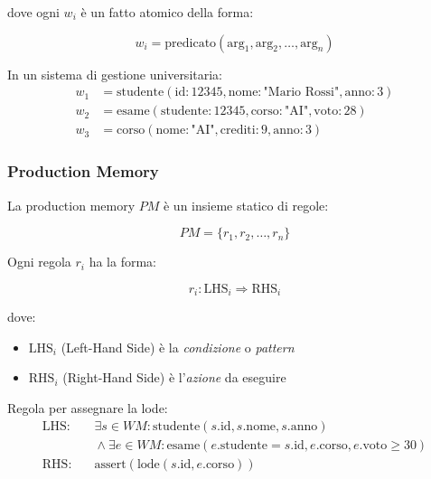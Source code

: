 dove ogni $w_i$ è un fatto atomico della forma:

\begin{equation}
w_i = \text{predicato}(\text{arg}_1, \text{arg}_2, \ldots, \text{arg}_n)
\end{equation}

\begin{esempio}
In un sistema di gestione universitaria:
\begin{align*}
w_1 &= \text{studente}(\text{id}: 12345, \text{nome}: \text{"Mario Rossi"}, \text{anno}: 3)\\
w_2 &= \text{esame}(\text{studente}: 12345, \text{corso}: \text{"AI"}, \text{voto}: 28)\\
w_3 &= \text{corso}(\text{nome}: \text{"AI"}, \text{crediti}: 9, \text{anno}: 3)
\end{align*}
\end{esempio}

\subsubsection{Production Memory}

La production memory $PM$ è un insieme statico di regole:

\begin{equation}
PM = \{r_1, r_2, \ldots, r_n\}
\end{equation}

Ogni regola $r_i$ ha la forma:

\begin{equation}
r_i: \text{LHS}_i \Rightarrow \text{RHS}_i
\end{equation}

dove:
\begin{itemize}
\item $\text{LHS}_i$ (Left-Hand Side) è la \textit{condizione} o \textit{pattern}
\item $\text{RHS}_i$ (Right-Hand Side) è l'\textit{azione} da eseguire
\end{itemize}

\begin{esempio}
Regola per assegnare la lode:
\begin{equation*}
\begin{split}
\text{LHS}: &\quad \exists s \in WM: \text{studente}(s.\text{id}, s.\text{nome}, s.\text{anno})\\
&\quad \land \exists e \in WM: \text{esame}(e.\text{studente} = s.\text{id}, e.\text{corso}, e.\text{voto} \geq 30)\\
\text{RHS}: &\quad \text{assert}(\text{lode}(s.\text{id}, e.\text{corso}))
\end{split}
\end{equation*}
\end{esempio}

